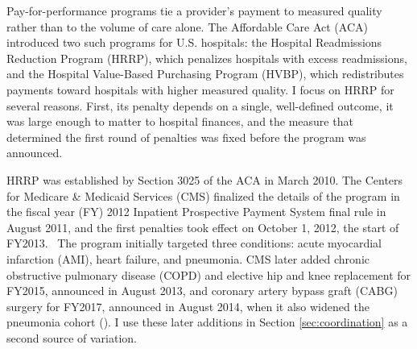 \documentclass[12pt]{article}
\theoremstyle{definition}   %
\begin{document}
    Pay-for-performance programs tie a provider's payment to measured quality rather than to the volume of care alone. The Affordable Care Act (ACA) introduced two such programs for U.S. hospitals: the Hospital Readmissions Reduction Program (HRRP), which penalizes hospitals with excess readmissions, and the Hospital Value-Based Purchasing Program (HVBP), which redistributes payments toward hospitals with higher measured quality. I focus on HRRP for several reasons. First, its penalty depends on a single, well-defined outcome, it was large enough to matter to hospital finances, and the measure that determined the first round of penalties was fixed before the program was announced.

    HRRP was established by Section 3025 of the ACA in March 2010. The Centers for Medicare \& Medicaid Services (CMS) finalized the details of the program in the fiscal year (FY) 2012 Inpatient Prospective Payment System final rule in August 2011, and the first penalties took effect on October 1, 2012, the start of FY2013.%
    \ The program initially targeted three conditions: acute myocardial infarction (AMI), heart failure, and pneumonia. CMS later added chronic obstructive pulmonary disease (COPD) and elective hip and knee replacement for FY2015, announced in August 2013, and coronary artery bypass graft (CABG) surgery for FY2017, announced in August 2014, when it also widened the pneumonia cohort (\cite{kff_hrrp}). I use these later additions in Section \ref{sec:coordination} as a second source of variation.
\end{document}
